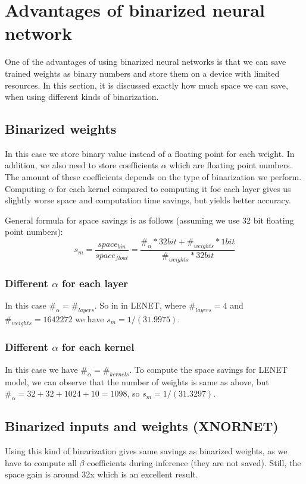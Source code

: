 \documentclass[licencjacka]{pracamgr}
\begin{document}
	\chapter{Advantages of binarized neural network}
    One of the advantages of using binarized neural networks is that we can save trained weights as binary numbers and store them on a device with limited resources. In this section, it is discussed exactly how much space we can save, when using different kinds of binarization.
    
    \section{Binarized weights}
        In this case we store binary value instead of a floating point for each weight. In addition, we also need to store coefficients $\alpha$ which are floating point numbers. The amount of these coefficients depends on the type of binarization we perform. Computing $\alpha$ for each kernel compared to computing it foe each layer gives us slightly worse space and computation time savings, but yields better accuracy.
        
        General formula for space savings is as follows (assuming we use 32 bit floating point numbers):
        $$s_m =  \frac{space_{bin}}{space_{float}} = \frac{\#_\alpha * 32bit + \#_{weights}*1bit}{\#_{weights} * 32bit} $$
        
        \subsection{Different $\alpha$ for each layer }
        In this case $\#_\alpha = \#_{layers}$. So in in LENET, where $\#_{layers} = 4$ and $\#_{weights} = 1642272$ we have $s_m = 1/(31.9975)$.
        
        \subsection{Different $\alpha$ for each kernel }
        In this case we have $\#_\alpha = \#_{kernels}$. To compute the space savings for LENET model, we can observe that the number of weights is same as above, but $\#_\alpha = 32+32+1024+10 = 1098$, so $s_m = 1/(31.3297)$.
	    
	    \section{Binarized inputs and weights (XNORNET)}
	    Using this kind of binarization gives same savings as binarized weights, as we have to compute all $\beta$ coefficients during inference (they are not saved). Still, the space gain is around 32x which is an excellent result.
\end{document}
